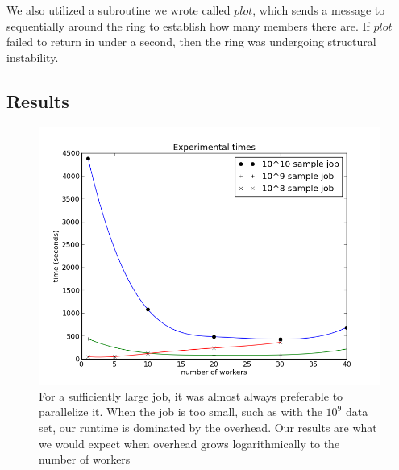 \documentclass[10pt, conference, compsocconf]{IEEEtran}
\begin{document}
We also utilized a subroutine we wrote called $plot$, which sends a message to sequentially around the ring to establish how many members there are.  If $plot$ failed to return in under a second, then the ring was undergoing structural instability.

\subsection{Results}

\begin{figure}
    \includegraphics[width=\linewidth]{expTime}
    \caption{For a sufficiently large job, it was almost always preferable to parallelize it.  When the job is too small, such as with the $10^{9}$ data set, our runtime is dominated by the overhead.  Our results are what we would expect when overhead grows logarithmically to the number of workers}
    \label{expTime}
\end{figure}
\end{document}
